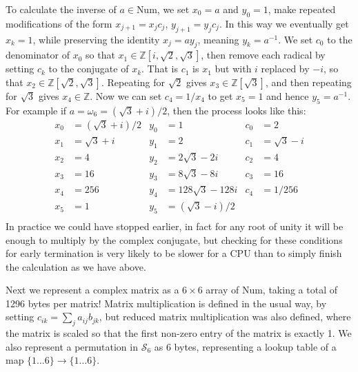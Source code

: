 To calculate the inverse of $a \in \text{Num}$, we set $x_0 = a$ and $y_0 = 1$, make repeated modifications of the form $x_{j+1} = x_jc_j$, $y_{j+1} = y_jc_j$. In this way we eventually get $x_k = 1$, while preserving the identity $x_j = ay_j$, meaning $y_k = a^{-1}$. We set $c_0$ to the denominator of $x_0$ so that $x_1 \in \mathbb{Z}[i, \sqrt{2}, \sqrt{3}]$, then remove each radical by setting $c_k$ to the conjugate of $x_k$. That is $c_1$ is $x_1$ but with $i$ replaced by $-i$, so that $x_2 \in \mathbb{Z}[\sqrt{2}, \sqrt{3}]$. Repeating for $\sqrt{2}$ gives $x_3 \in \mathbb{Z}[\sqrt{3}]$, and then repeating for $\sqrt{3}$ gives $x_4 \in \mathbb{Z}$. Now we can set $c_4 = 1/x_4$ to get $x_5 = 1$ and hence $y_5 = a^{-1}$. For example if $a = \omega_{6} = (\sqrt{3} + i)/2$, then the process looks like this:
\begin{align*}
x_0 &= (\sqrt{3} + i)/2 & y_0 &= 1 & c_0 &= 2 \\
x_1 &= \sqrt{3} + i & y_1 &= 2 & c_1 &= \sqrt{3}-i \\
x_2 &= 4 & y_2 &= 2\sqrt{3}-2i & c_2 &= 4 \\
x_3 &= 16 & y_3 &= 8\sqrt{3}-8i & c_3 &= 16 \\
x_4 &= 256 & y_4 &= 128\sqrt{3}-128i & c_4 &= 1/256 \\
x_5 &= 1 & y_5 &= (\sqrt{3}-i)/2 & \\
\end{align*}
In practice we could have stopped earlier, in fact for any root of unity it will be enough to multiply by the complex conjugate, but checking for these conditions for early termination is very likely to be slower for a CPU than to simply finish the calculation as we have above.

Next we represent a complex matrix as a $6\times 6$ array of Num, taking a total of 1296 bytes per matrix! Matrix multiplication is defined in the usual way, by setting $c_{ik} = \sum_j a_{ij}b_{jk}$, but reduced matrix multiplication was also defined, where the matrix is scaled so that the first non-zero entry of the matrix is exactly 1. We also represent a permutation in $\mathcal{S}_6$ as 6 bytes, representing a lookup table of a map $\{1\dots 6\} \to \{1 \dots 6\}$.

